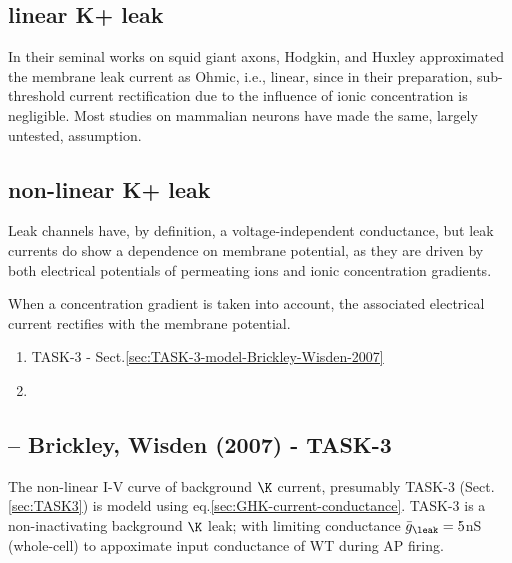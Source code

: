 \subsection{linear K+ leak}

In their seminal works on squid giant axons, Hodgkin, and Huxley approximated
the membrane leak current as Ohmic, i.e., linear, since in their preparation,
sub-threshold current rectification due to the influence of ionic concentration
is negligible.
Most studies on mammalian neurons have made the same, largely untested,
assumption.


\subsection{non-linear K+ leak}

Leak channels have, by definition, a voltage-independent conductance, but leak
currents do show a dependence on membrane potential, as they are driven by both
electrical potentials of permeating ions and ionic concentration gradients.

When a concentration gradient is taken into account, the associated electrical
current rectifies with the membrane potential.
\begin{enumerate}
  \item TASK-3 - Sect.\ref{sec:TASK-3-model-Brickley-Wisden-2007}
  \item 
\end{enumerate}

\subsection{-- Brickley, Wisden (2007) - TASK-3}
\label{sec:CNG-Brickley-Wisden-2007}
\label{sec:TASK-3-model-Brickley-Wisden-2007}

The non-linear I-V curve of background $\K$ current, presumably TASK-3
(Sect.\ref{sec:TASK3}) is modeld using eq.\ref{sec:GHK-current-conductance}. 
TASK-3 is a non-inactivating background $\K$ leak; with limiting conductance
$\bar{g}_\leak = 5 $nS (whole-cell) to appoximate input conductance of WT
during AP firing.

